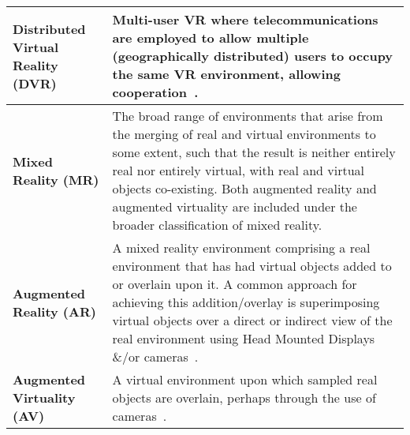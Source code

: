 \begin{center}
\begin{longtable}{| l | p{10cm} |}

\textbf{Distributed Virtual Reality (DVR)} & Multi-user VR where telecommunications are employed to allow multiple (geographically distributed) users to occupy the same VR environment, allowing cooperation~\cite{Terashima2001}. \\

\hline
		


\textbf{Mixed Reality (MR)} & The broad range of environments that arise from the merging of real and virtual environments to some extent, such that the result is neither entirely real nor entirely virtual, with real and virtual objects co-existing. Both augmented reality and augmented virtuality are included under the broader classification of mixed reality. \\

\hline
		

\textbf{Augmented Reality (AR)} & A mixed reality environment comprising a real environment that has had virtual objects added to or overlain upon it. A common approach for achieving this addition/overlay is superimposing virtual objects over a direct or indirect view of the real environment using Head Mounted Displays \&/or cameras~\cite{Krevelen2010}. \\



\hline


\textbf{Augmented Virtuality (AV)} & A virtual environment upon which sampled real objects are overlain, perhaps through the use of cameras~\cite{caballero:behand}. \\



\end{longtable}
\end{center}
